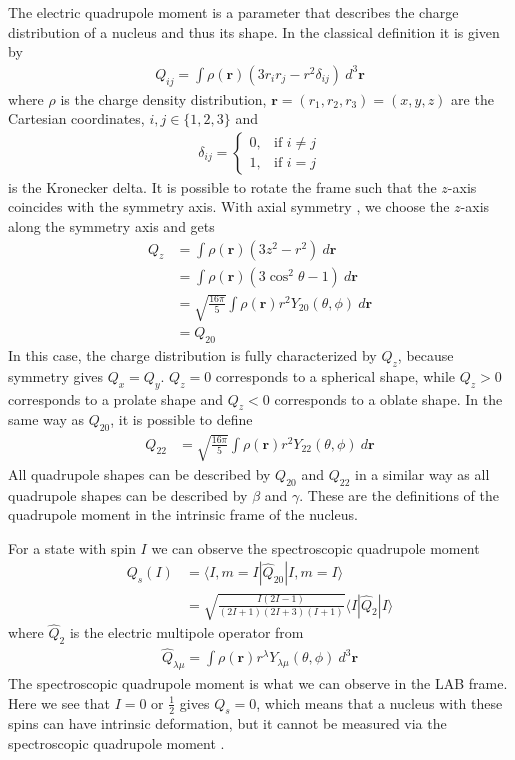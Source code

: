 \documentclass[twoside,english]{uiofysmaster/uiofysmaster}
\newcommand{\ga}{$\gamma$}
\begin{document}
The electric quadrupole moment is a parameter that describes the charge distribution of a nucleus and thus its shape.
In the classical definition it is given by
\begin{align}
	Q_{ij} = \int \rho(\mathbf{r}) (3r_i r_j - r^2 \delta_{ij}) ~d^3 \mathbf{r}
\end{align}
where $\rho$ is the charge density distribution, $\mathbf{r} = (r_1, r_2, r_3) = (x, y, z)$ are the Cartesian coordinates, $i,j \in \{ 1, 2, 3 \}$ and
\begin{align}
	\delta_{ij} =
    \begin{cases}
    		0, & \text{if } i \neq j \\
    		1, & \text{if } i = j
    \end{cases}
\end{align}
is the Kronecker delta.
It is possible to rotate the frame such that the $z$-axis coincides with the symmetry axis. 
With axial symmetry \cite{Niedermaier, ELP}, we choose the $z$-axis along the symmetry axis and gets
\begin{align}
	Q_z &= \int \rho(\mathbf{r}) (3z^2 - r^2) ~d \mathbf{r} \nonumber \\
	&=  \int \rho(\mathbf{r}) (3\cos^2 \theta - 1) ~d \mathbf{r} \nonumber \\
	&=  \sqrt{\frac{16\pi}{5}} \int \rho(\mathbf{r}) r^2 Y_{20}(\theta, \phi) ~d \mathbf{r} \nonumber \\
	&= Q_{20}
\end{align}
In this case, the charge distribution is fully characterized by $Q_z$, because symmetry gives $Q_x = Q_y$. 
$Q_z = 0$ corresponds to a spherical shape, while $Q_z > 0$ corresponds to a prolate shape and $Q_z < 0$ corresponds to a oblate shape.
In the same way as $Q_{20}$, it is possible to define 
\begin{align}
	Q_{22} &= \sqrt{\frac{16\pi}{5}} \int \rho(\mathbf{r}) r^2 Y_{22}(\theta, \phi) ~d \mathbf{r}
\end{align}
All quadrupole shapes can be described by $Q_{20}$ and $Q_{22}$ in a similar way as all quadrupole shapes can be described by $\beta$ and \ga. These are the definitions of the quadrupole moment in the intrinsic frame of the nucleus.

For a state with spin $I$ we can observe the spectroscopic quadrupole moment
\begin{align}
	Q_s(I) &= \langle I, m = I | \hat{Q}_{20} | I, m = I \rangle \\
	&= \sqrt{\frac{I(2I - 1)}{(2I + 1)(2I + 3)(I + 1)}} \langle I | \hat{Q}_2 | I \rangle
\end{align}
where $\hat{Q}_2$ is the electric multipole operator \cite{RS} from
\begin{align}
	\hat{Q}_{\lambda \mu} = \int \rho(\mathbf{r}) r^\lambda Y_{\lambda \mu}(\theta, \phi) ~d^3 \mathbf{r}
\end{align}
The spectroscopic quadrupole moment is what we can observe in the LAB frame.
Here we see that $I = 0$ or $\tfrac{1}{2}$ gives $Q_s = 0$, which means that a nucleus with these spins can have intrinsic deformation, but it cannot be measured via the spectroscopic quadrupole moment \cite{ELP}.  
\end{document}
